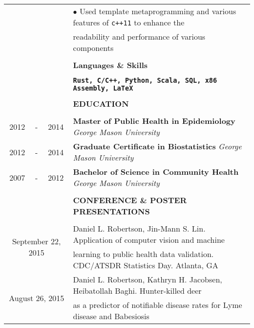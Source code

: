 \documentclass[10pt]{article}
\begin{document}
\begin{table}[ht]
\begin{tabular}{@{\hspace{0mm}}c@{\hspace{1mm}}c@{\hspace{3mm}}cl}
            & & & $\bullet$ Used template metaprogramming and various features of \texttt{c++11} to enhance the\\
            & & & \hspace*{4mm}readability and performance of various components\\[-1mm]
            & & & \color{maroon}{\rule{14cm}{0.75pt}}\\
            & & & \large{\textbf{Languages \& Skills}}\\[-2mm]
            & & & \color{maroon}{\rule{14cm}{0.75pt}}\\
            \multicolumn{3}{c}{} & \textbf{\texttt{Rust, C/C++, Python, Scala, SQL, x86 Assembly, \LaTeX}}\\[-1mm]
            & & & \color{maroon}{\rule{14cm}{0.75pt}}\\
            & & & \large{\textbf{EDUCATION}}\\[-2mm]
            & & & \color{maroon}{\rule{14cm}{0.75pt}}\\
            2012 & - & 2014 & \textbf{Master of Public Health in Epidemiology} \textit{George Mason University}\\[1mm]
            2012 & - & 2014 & \textbf{Graduate Certificate in Biostatistics} \textit{George Mason University}\\[1mm]
            2007 & - & 2012 & \textbf{Bachelor of Science in Community Health} \textit{George Mason University}\\[-1mm]
            & & & \color{maroon}{\rule{14cm}{0.75pt}}\\
            & & & \large{\textbf{CONFERENCE \& POSTER PRESENTATIONS}}\\[-2mm]
            & & & \color{maroon}{\rule{14cm}{0.75pt}}\\
            \multicolumn{3}{c}{\multirow{2}{*}{September 22, 2015}} & Daniel L. Robertson, Jin-Mann S. Lin. Application of computer vision and machine\\
            & & & learning to public health data validation. CDC/ATSDR Statistics Day. Atlanta, GA\\[2mm]
            \multicolumn{3}{c}{\multirow{4}{*}{August 26, 2015}} & Daniel L. Robertson, Kathryn H. Jacobsen, Heibatollah Baghi. Hunter-killed deer\\
            & & & as a predictor of notifiable disease rates for Lyme disease and Babesiosis\\

\end{tabular}
\end{table}
\end{document}
